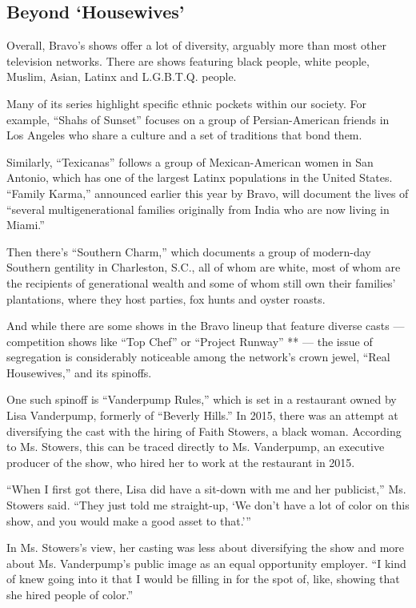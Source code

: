 \hypertarget{beyond-housewives}{%
\subsection{Beyond `Housewives'}\label{beyond-housewives}}

Overall, Bravo's shows offer a lot of diversity, arguably more than most
other television networks. There are shows featuring black people, white
people, Muslim, Asian, Latinx and L.G.B.T.Q. people.

Many of its series highlight specific ethnic pockets within our society.
For example, ``Shahs of Sunset'' focuses on a group of Persian-American
friends in Los Angeles who share a culture and a set of traditions that
bond them.

Similarly, ``Texicanas'' follows a group of Mexican-American women in
San Antonio, which has one of the largest Latinx populations in the
United States. ``Family Karma,'' announced earlier this year by Bravo,
will document the lives of ``several multigenerational families
originally from India who are now living in Miami.''

Then there's ``Southern Charm,'' which documents a group of modern-day
Southern gentility in Charleston, S.C., all of whom are white, most of
whom are the recipients of generational wealth and some of whom still
own their families' plantations, where they host parties, fox hunts and
oyster roasts.

And while there are some shows in the Bravo lineup that feature diverse
casts --- competition shows like ``Top Chef'' or ``Project Runway'' **
--- the issue of segregation is considerably noticeable among the
network's crown jewel, ``Real Housewives,'' and its spinoffs.

One such spinoff is ``Vanderpump Rules,'' which is set in a restaurant
owned by Lisa Vanderpump, formerly of ``Beverly Hills.'' In 2015, there
was an attempt at diversifying the cast with the hiring of Faith
Stowers, a black woman. According to Ms. Stowers, this can be traced
directly to Ms. Vanderpump, an executive producer of the show, who hired
her to work at the restaurant in 2015.

``When I first got there, Lisa did have a sit-down with me and her
publicist,'' Ms. Stowers said. ``They just told me straight-up, `We
don't have a lot of color on this show, and you would make a good asset
to that.'''

In Ms. Stowers's view, her casting was less about diversifying the show
and more about Ms. Vanderpump's public image as an equal opportunity
employer. ``I kind of knew going into it that I would be filling in for
the spot of, like, showing that she hired people of color.''

